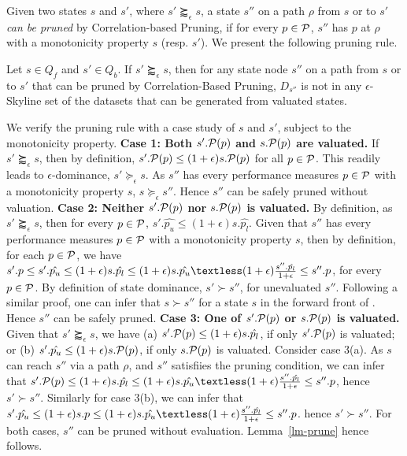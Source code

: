 Given two states $s$ and $s'$,  
where $s' \succapprox_{\epsilon} s$, 
a state $s''$ on a path $\rho$ from $s$ or to $s'$ 
{\em can be pruned} by Correlation-based Pruning, if for every $p\in \P$, $s''$ has $p$ 
at $\rho$ with a monotonicity property 
\wrt $s$ (resp. $s'$). 
We present the following pruning rule. 

\begin{lemma}
\label{lm-prune}
Let $s \in Q_f$ and $s' \in Q_b$. 
If $s' \succapprox_{\epsilon} s$, 
then for any state node $s''$ 
on a path from $s$ or to $s'$  
that can be pruned by Correlation-Based Pruning, 
$D_{s''}$ is not in any $\epsilon$-Skyline set  
of the datasets that can be generated from valuated states.
\end{lemma} 

\begin{proofS}
We verify the pruning rule with a case study of 
$s$ and $s'$, subject to 
the monotonicity property.  
\textbf{Case 1: Both $s'.\P(p)$ and $s.\P(p)$ are valuated.}
If $s' \succapprox_{\epsilon} s$, then by definition, $s'.\P(p)\leq (1+\epsilon) s.\P(p)$ for all $p \in \P$. This 
readily leads to $\epsilon$-dominance, \ie $s'\succeq_\epsilon s$. As $s''$ has every performance measures 
$p\in \P$ with a monotonicity property \wrt $s$, 
$s\succeq_\epsilon s''$. Hence $s''$ can be safely pruned without valuation. 
\textbf{Case 2: Neither $s'.\P(p)$ nor $s.\P(p)$ is valuated.} By definition, as $s' \succapprox_{\epsilon} s$, 
then for every $p\in \P$, $s'.\hat{p_u}\leq (1+\epsilon) s.\hat{p_l}$. 
Given that $s''$ has every performance measures 
$p\in \P$ with a monotonicity property \wrt $s$, 
then by definition, for each $p\in \P$, we have 
$s'.p\leq s'.\hat{p_u}\leq (1+\epsilon) s.\hat{p_l}\leq (1+\epsilon)s.\hat{p_u}\textless (1+\epsilon)\frac{s''.\hat{p_l}}{1+\epsilon} \leq s''.p$, for 
every $p\in \P$. By definition of state dominance, $s' \succ s''$, for unevaluated $s''$.  
Following a similar proof, 
one can infer that $s \succ s''$ 
for a state $s$ in the forward front 
of \bimodis. 
Hence $s''$ can be safely pruned. 
\textbf{Case 3: One of $s'.\P(p)$ or $s.\P(p)$ is valuated.}
Given that $s' \succapprox_{\epsilon} s$, we have  
 (a) $s'.\P(p) \leq (1+\epsilon) s.\hat{p_l}$, if only $s'.\P(p)$ is valuated; or  (b) $s'.\hat{p_u} \leq (1+\epsilon) s.\P(p)$, if only $s.\P(p)$ is valuated.
Consider case 3(a). 
As $s$ can reach $s''$ via a path $\rho$, and 
$s''$ satisfiies the pruning condition, 
we can infer that 
$s'.\P(p) \leq (1+\epsilon) s.\hat{p_l} \leq 
(1+\epsilon) s.\hat{p_u} \textless (1+\epsilon) 
\frac{s''.\hat{p_l}}{1+\epsilon}\leq s''.p$, 
hence $s'\succ s''$. Similarly for case 3(b), we can infer that   
$s'.\hat{p_u} \leq (1+\epsilon) s.p \leq 
(1+\epsilon) s.\hat{p_u} \textless (1+\epsilon) 
\frac{s''.\hat{p_l}}{1+\epsilon}\leq s''.p$. 
hence $s'\succ s''$.  
For both cases, $s''$ can be pruned 
without evaluation. 
Lemma~\ref{lm-prune} hence follows. 
\end{proofS}



